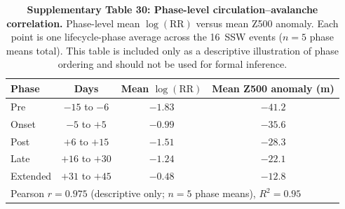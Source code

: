 \documentclass[11pt,letterpaper]{article}
\begin{document}
\begin{table}[!ht]
\centering
\caption{\textbf{Supplementary Table 30: Phase-level circulation--avalanche correlation.}
Phase-level mean $\log(\mathrm{RR})$ versus mean Z500 anomaly. Each point is one lifecycle-phase average across the 16~SSW events ($n = 5$ phase means total). This table is included only as a descriptive illustration of phase ordering and should not be used for formal inference.}
\label{tab:phase_correlation}
\small
\begin{tabular}{lccc}
\toprule
Phase & Days & Mean $\log(\mathrm{RR})$ & Mean Z500 anomaly (m) \\
\midrule
Pre & $-15$ to $-6$ & $-1.83$ & $-41.2$ \\
Onset & $-5$ to $+5$ & $-0.99$ & $-35.6$ \\
Post & $+6$ to $+15$ & $-1.51$ & $-28.3$ \\
Late & $+16$ to $+30$ & $-1.24$ & $-22.1$ \\
Extended & $+31$ to $+45$ & $-0.48$ & $-12.8$ \\
\midrule
\multicolumn{4}{l}{Pearson $r = 0.975$ (descriptive only; $n = 5$ phase means), $R^2 = 0.95$} \\
\bottomrule
\end{tabular}
\end{table}
\end{document}
